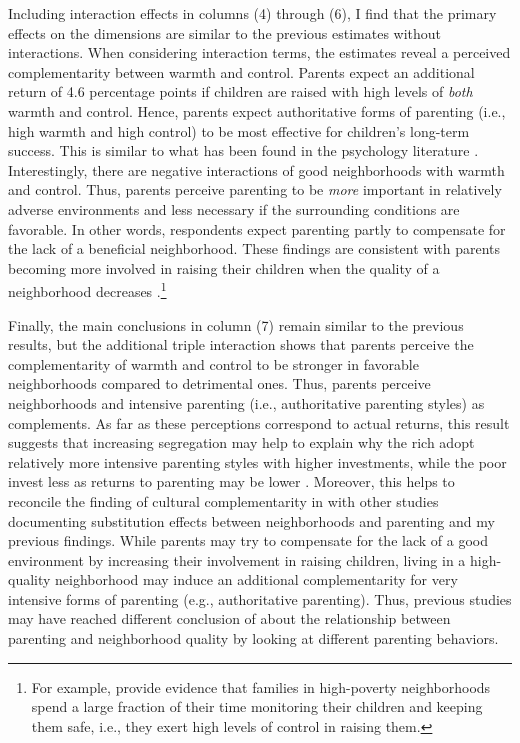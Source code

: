 \documentclass[12pt, a4paper, english]{article}
\begin{document}
Including interaction effects in columns (4) through (6), I find that the primary effects on the dimensions are similar to the previous estimates without interactions. When considering interaction terms, the estimates reveal a perceived complementarity between warmth and control. Parents expect an additional return of 4.6 percentage points if children are raised with high levels of \textit{both} warmth and control. Hence, parents expect authoritative forms of parenting (i.e., high warmth and high control) to be most effective for children's long-term success. This is similar to what has been found in the psychology literature \citep{Dornbuschetal1987,Baumrind1967,Lambornetal1991}. Interestingly, there are negative interactions of good neighborhoods with warmth and control. Thus, parents perceive parenting to be \textit{more} important in relatively adverse environments and less necessary if the surrounding conditions are favorable. In other words, respondents expect parenting partly to compensate for the lack of a beneficial neighborhood. These findings are consistent with parents becoming more involved in raising their children when the quality of a neighborhood decreases \citep[e.g.,][]{Klingetal2005,PopElechesUrquiola2013,Han2019}.\footnote{For example, \citet{Klingetal2005} provide evidence that families in high-poverty neighborhoods spend a large fraction of their time monitoring their children and keeping them safe, i.e., they exert high levels of control in raising them.} 

Finally, the main conclusions in column (7) remain similar to the previous results, but the additional triple interaction shows that parents perceive the complementarity of warmth and control to be stronger in favorable neighborhoods compared to detrimental ones. Thus, parents perceive neighborhoods and intensive parenting (i.e., authoritative parenting styles) as complements. As far as these perceptions correspond to actual returns, this result suggests that increasing segregation may help to explain why the rich adopt relatively more intensive parenting styles with higher investments, while the poor invest less as returns to parenting may be lower \citep[see also the discussion in][]{Doepkeetal2019}. Moreover, this helps to reconcile the finding of cultural complementarity in \citet{PatacchiniZenou2011} with other studies documenting substitution effects between neighborhoods and parenting \citep[e.g.,][]{PopElechesUrquiola2013} and my previous findings. While parents may try to compensate for the lack of a good environment by increasing their involvement in raising children, living in a high-quality neighborhood may induce an additional complementarity for very intensive forms of parenting (e.g., authoritative parenting). Thus, previous studies may have reached different conclusion of about the relationship between parenting and neighborhood quality by looking at different parenting behaviors.
\end{document}

